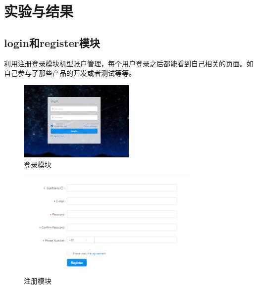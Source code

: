 \chapter{实验与结果}
\label{cha:experiment}
\section{login和register模块}
利用注册登录模块机型账户管理，每个用户登录之后都能看到自己相关的页面。如自己参与了那些产品的开发或者测试等等。
\begin{figure}[h]
	\centering
	\includegraphics[width=0.5\textwidth]{image/result/login.png}
	\caption{登录模块}
	\label{fig:login}
\end{figure}
\begin{figure}[h]
	\centering
	\includegraphics[width=0.8\textwidth]{image/result/register.png}
	\caption{注册模块}
	\label{fig:register}
\end{figure}

